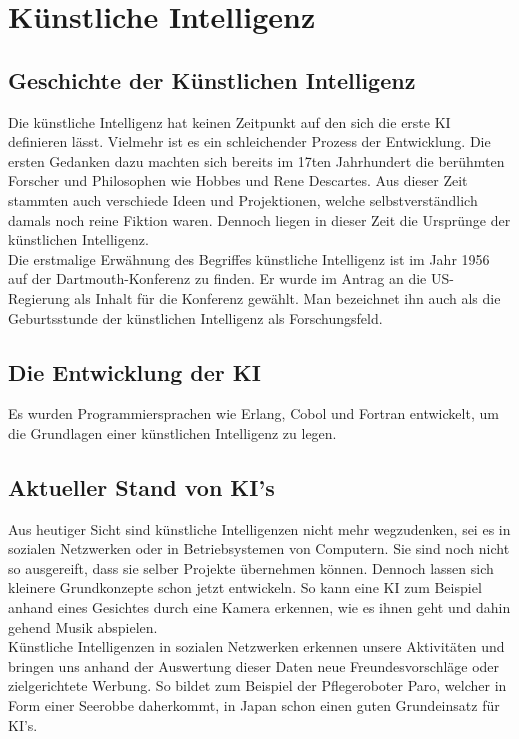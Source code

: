 %
%
%
%

\chapter{Künstliche Intelligenz}
\section{Geschichte der Künstlichen Intelligenz}
Die künstliche Intelligenz hat keinen Zeitpunkt auf den sich die erste KI definieren lässt. Vielmehr ist es ein schleichender Prozess der Entwicklung. Die ersten Gedanken dazu machten sich bereits im 17ten Jahrhundert die berühmten Forscher und Philosophen wie Hobbes und Rene Descartes. Aus dieser Zeit stammten auch verschiede Ideen und Projektionen, welche selbstverständlich damals noch reine Fiktion waren. Dennoch liegen in dieser Zeit die Ursprünge der künstlichen Intelligenz. \\
	Die erstmalige Erwähnung des Begriffes \dq künstliche Intelligenz \dq ist im Jahr 1956  auf der Dartmouth-Konferenz zu finden. Er wurde im Antrag an die US-Regierung als Inhalt für die Konferenz gewählt. Man bezeichnet ihn auch als die Geburtsstunde der künstlichen Intelligenz als Forschungsfeld. ~\cite{telekomag2019}

\section{Die Entwicklung der KI}
Es wurden Programmiersprachen wie Erlang, Cobol und Fortran entwickelt, um die Grundlagen einer künstlichen Intelligenz zu legen.  ~\cite{erhardkonrad2000}






\section{Aktueller Stand von KI's}
Aus heutiger Sicht sind künstliche Intelligenzen nicht mehr wegzudenken, sei es in sozialen Netzwerken oder in Betriebsystemen von Computern. Sie sind noch nicht so ausgereift, dass sie selber Projekte übernehmen können. Dennoch lassen sich kleinere Grundkonzepte schon jetzt entwickeln. So kann eine KI zum Beispiel anhand eines Gesichtes durch eine Kamera erkennen, wie es ihnen geht und dahin gehend Musik abspielen. \\
Künstliche Intelligenzen in sozialen Netzwerken erkennen unsere Aktivitäten und bringen uns anhand der Auswertung dieser Daten neue Freundesvorschläge oder zielgerichtete Werbung. So bildet zum Beispiel der Pflegeroboter Paro, welcher in Form einer Seerobbe daherkommt, in Japan schon einen guten Grundeinsatz für KI's.



